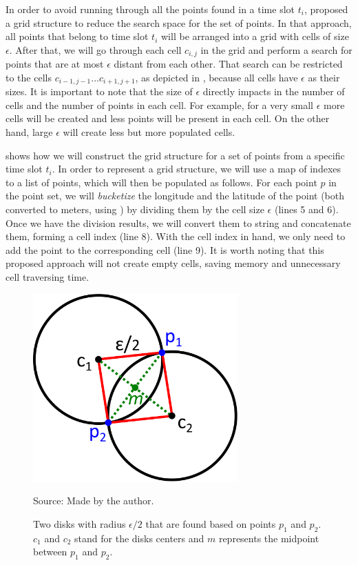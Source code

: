 In order to avoid running  through all the points found in a time slot $t_i$, 
proposed a grid structure to reduce the search space for the set of points. In that approach, all points that belong to
time slot $t_i$ will be arranged into a grid with cells of size $\epsilon$. After that, we will go through each cell
$c_{i,j}$ in the grid and perform a search for points that are at most $\epsilon$ distant from each other. That search
can be restricted to the cells $c_{i - 1, j - 1} ... c_{i + 1, j + 1}$, as depicted in , because all
cells have $\epsilon$ as their sizes. It is important to note that the size of $\epsilon$ directly impacts in the number
of cells and the number of points in each cell. For example, for a very small $\epsilon$ more cells will be created and
less points will be present in each cell. On the other hand, large $\epsilon$ will create less but more populated cells.

 shows how we will construct the grid structure for a set of points from a specific time slot $t_i$.
In order to represent a grid structure, we will use a map of indexes to a list of points, which will then be populated
as follows. For each point $p$ in the point set, we will \textit{bucketize} the longitude and the latitude of the point
(both converted to meters, using ) by dividing them by the cell size $\epsilon$ (lines 5 and 6).
Once we have the division results, we will convert them to string and concatenate them, forming a cell index (line 8).
With the cell index in hand, we only need to add the point to the corresponding cell (line 9). It is worth noting that
this proposed approach will not create empty cells, saving memory and unnecessary cell traversing time.

\begin{figure}[h!]
    \centering
    \caption{Two disks with radius $\epsilon/2$ that are found based on points $p_1$ and $p_2$. $c_1$ and $c_2$ stand
        for the disks centers and $m$ represents the midpoint between $p_1$ and $p_2$.}
    \centerline{\includegraphics[width=0.7\textwidth]{images/disks_discovery.eps}}
    \footnotesize{Source: Made by the author.}
    \label{fig:disks_discovery}
\end{figure}

